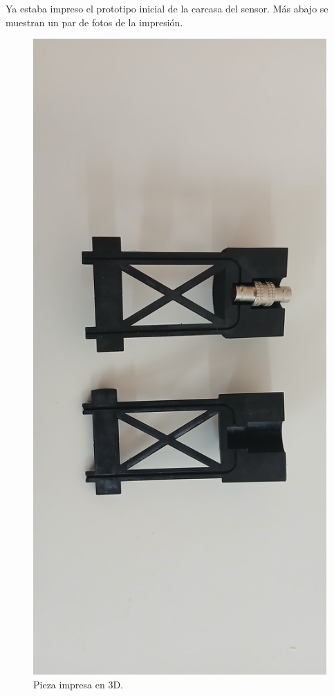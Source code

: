 
Ya estaba impreso el prototipo inicial de la carcasa del sensor. Más abajo se muestran un par de fotos de la impresión. 

\begin{figure}[!ht]
	\centering
	\includegraphics[width=0.97\linewidth]{Figures/14_04_2025/Pieza_impresa}
	\caption{Pieza impresa en 3D.}
	\label{fig:piezaimpresa}
\end{figure}


